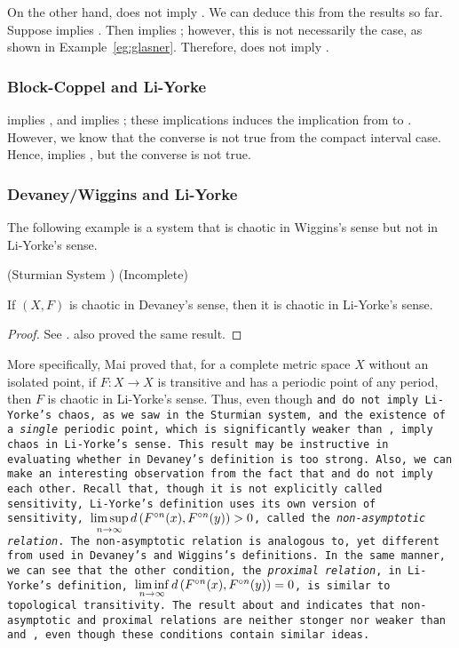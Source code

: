 \documentclass[12pt,twoside,draft]{book}
\begin{document}
On the other hand, \dev does not imply \blcp.
We can deduce this from the results so far.
Suppose \dev implies \blcp.
Then \dev implies \pte; however, this is not necessarily the case, as shown in Example~\ref{eg:glasner}.
Therefore, \dev does not imply \blcp.

\subsubsection*{Block-Coppel and Li-Yorke}
\blcp implies \pte, and \pte implies \liy; these implications induces the implication from \blcp to \liy.
However, we know that the converse is not true from the compact interval case.
Hence, \blcp implies \liy, but the converse is not true.

\subsubsection*{Devaney/Wiggins and Li-Yorke}
The following example is a system that is chaotic in Wiggins's sense but not in Li-Yorke's sense.
\begin{example}
  (Sturmian System \citep{blanchard})
  (Incomplete)
\end{example}
\begin{theorem}
  If $(X, F)$ is chaotic in Devaney's sense, then it is chaotic in Li-Yorke's sense.
  \begin{proof}
    See \citet{mai}.
    \citet{huang} also proved the same result.
  \end{proof}
  \label{thm:dev-liy}
\end{theorem}
More specifically, Mai proved that, for a complete metric space $X$ without an isolated point, if $F: X \to X$ is transitive and has a periodic point of any period, then $F$ is chaotic in Li-Yorke's sense.
Thus, even though \tt and \sdic do not imply Li-Yorke's chaos, as we saw in the Sturmian system, \tt and the existence of a \textit{single} periodic point, which is significantly weaker than \dpp, imply chaos in Li-Yorke's sense.
This result may be instructive in evaluating whether \dpp in Devaney's definition is too strong.
Also, we can make an interesting observation from the fact that \wig and \liy do not imply each other. 
Recall that, though it is not explicitly called sensitivity, Li-Yorke's definition uses its own version of sensitivity, $\limsup\limits_{n\to \infty} d\left( F^{\circ n}(x), F^{\circ n}(y) \right) > 0$, called the \textit{non-asymptotic relation}.
The non-asymptotic relation is analogous to, yet different from \sdic used in Devaney's and Wiggins's definitions.
In the same manner, we can see that the other condition, the \textit{proximal relation}, in Li-Yorke's definition, $\liminf\limits_{n\to \infty} d\left( F^{\circ n}(x), F^{\circ n}(y) \right) = 0$, is similar to topological transitivity.
The result about \wig and \liy indicates that non-asymptotic and proximal relations are neither stonger nor weaker than \tt and \sdic, even though these conditions contain similar ideas.
\end{document}
